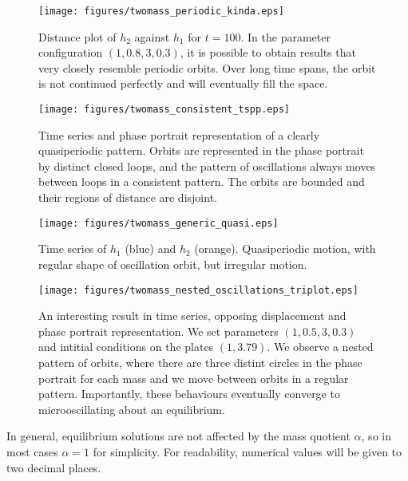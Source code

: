\documentclass{article}
\begin{document}
\begin{figure}
    \centering
    \texttt{[image: figures/twomass\_periodic\_kinda.eps]}
    \caption{
        Distance plot of $h_2$ against $h_1$ for $t=100$.
        In the parameter configuration \((1,0.8,3,0.3)\), it is possible to obtain results that very closely resemble periodic orbits.
        Over long time spans, the orbit is not continued perfectly and will eventually fill the space.
    }
    \label{fig:twomass_semiperiodic}
\end{figure}

\begin{figure}
    \centering
    \texttt{[image: figures/twomass\_consistent\_tspp.eps]}
    \caption{
        Time series and phase portrait representation of a clearly quasiperiodic pattern.
        Orbits are represented in the phase portrait by distinct closed loops,
        and the pattern of oscillations always moves between loops in a consistent pattern.
        The orbits are bounded and their regions of distance are disjoint.
    }
    \label{fig:twomass_nice_orbits_tspp}
\end{figure}

\begin{figure}
    \centering
    \texttt{[image: figures/twomass\_generic\_quasi.eps]}
    \caption{
        Time series of $h_1$ (blue) and $h_2$ (orange).
        Quasiperiodic motion, with regular shape of oscillation orbit,
        but irregular motion.
    }
    \label{fig:twomass_generic_quasi}
\end{figure}

\begin{figure}
    \centering
    \texttt{[image: figures/twomass\_nested\_oscillations\_triplot.eps]}
    \caption{
        An interesting result in time series, opposing displacement and phase portrait representation.
        We set parameters \((1,0.5,3,0.3)\) and intitial conditions on the plates \((1,3.79)\).
        We observe a nested pattern of orbits,
        where there are three distint circles in the phase portrait for each mass and we move between orbits in a regular pattern.
        Importantly, these behaviours eventually converge to microoscillating about an equilibrium.
    }
    \label{fig:twomass_nested_interesting_1}
\end{figure}

In general, equilibrium solutions are not affected by the mass quotient $\alpha$, so in most cases $\alpha = 1$ for simplicity.
For readability, numerical values will be given to two decimal places.
\end{document}
